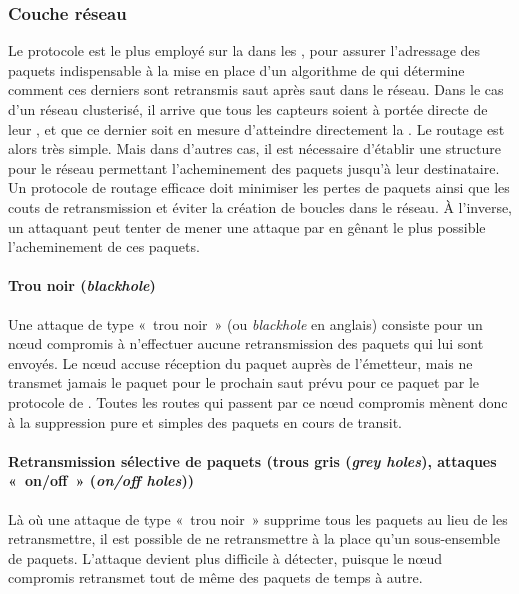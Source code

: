     \subsubsection{Couche réseau}
Le protocole \ip est le plus employé sur la  dans les \rcs, pour assurer l'adressage des paquets indispensable à la mise en place d'un algorithme de  qui détermine comment ces derniers sont retransmis saut après saut dans le réseau.
Dans le cas d'un réseau clusterisé, il arrive que tous les capteurs soient à portée directe de leur \ch, et que ce dernier soit en mesure d'atteindre directement la \sdb.
Le routage est alors très simple.
Mais dans d'autres cas, il est nécessaire d'établir une structure pour le réseau permettant l'acheminement des paquets jusqu'à leur destinataire.
Un protocole de routage efficace doit minimiser les pertes de paquets ainsi que les couts de retransmission et éviter la création de boucles dans le réseau.
À l'inverse, un attaquant peut tenter de mener une attaque par \dds en gênant le plus possible l'acheminement de ces paquets.

        \paragraph{Trou noir (\textit{blackhole})}
Une attaque de type « trou noir » (ou \textit{blackhole} en anglais) consiste pour un nœud compromis à n'effectuer aucune retransmission des paquets qui lui sont envoyés.
Le nœud accuse réception du paquet auprès de l'émetteur, mais ne transmet jamais le paquet pour le prochain saut prévu pour ce paquet par le protocole de .
Toutes les routes qui passent par ce nœud compromis mènent donc à la suppression pure et simples des paquets en cours de transit.

        \paragraph{Retransmission sélective de paquets (trous gris (\textit{grey holes}), attaques « on/off » (\textit{on/off holes}))}
Là où une attaque de type « trou noir »  supprime tous les paquets au lieu de les retransmettre, il est possible de ne retransmettre à la place qu'un sous-ensemble de paquets.
L'attaque devient plus difficile à détecter, puisque le nœud compromis retransmet tout de même des paquets de temps à autre.

